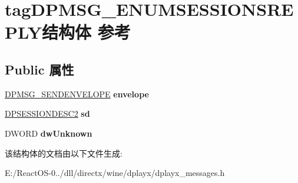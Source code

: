 \hypertarget{structtag_d_p_m_s_g___e_n_u_m_s_e_s_s_i_o_n_s_r_e_p_l_y}{}\section{tag\+D\+P\+M\+S\+G\+\_\+\+E\+N\+U\+M\+S\+E\+S\+S\+I\+O\+N\+S\+R\+E\+P\+L\+Y结构体 参考}
\label{structtag_d_p_m_s_g___e_n_u_m_s_e_s_s_i_o_n_s_r_e_p_l_y}
\subsection*{Public 属性}
\begin{DoxyCompactItemize}
\item 
\mbox{\label{structtag_d_p_m_s_g___e_n_u_m_s_e_s_s_i_o_n_s_r_e_p_l_y_a8702c60880bfbcd92d1ffc41246ceb56}} 
\hyperlink{structtag_d_p_m_s_g___s_e_n_d_e_n_v_e_l_o_p_e}{D\+P\+M\+S\+G\+\_\+\+S\+E\+N\+D\+E\+N\+V\+E\+L\+O\+PE} {\bfseries envelope}
\item 
\mbox{\label{structtag_d_p_m_s_g___e_n_u_m_s_e_s_s_i_o_n_s_r_e_p_l_y_a24496b539bf1ea19567f35e30fe8a286}} 
\hyperlink{structtag_d_p_s_e_s_s_i_o_n_d_e_s_c2}{D\+P\+S\+E\+S\+S\+I\+O\+N\+D\+E\+S\+C2} {\bfseries sd}
\item 
\mbox{\label{structtag_d_p_m_s_g___e_n_u_m_s_e_s_s_i_o_n_s_r_e_p_l_y_ac8f9576b96dede30da93b063dfc40fe8}} 
D\+W\+O\+RD {\bfseries dw\+Unknown}
\end{DoxyCompactItemize}


该结构体的文档由以下文件生成\+:\begin{DoxyCompactItemize}
\item 
E\+:/\+React\+O\+S-\/0../dll/directx/wine/dplayx/dplayx\+\_\+messages.\+h\end{DoxyCompactItemize}
